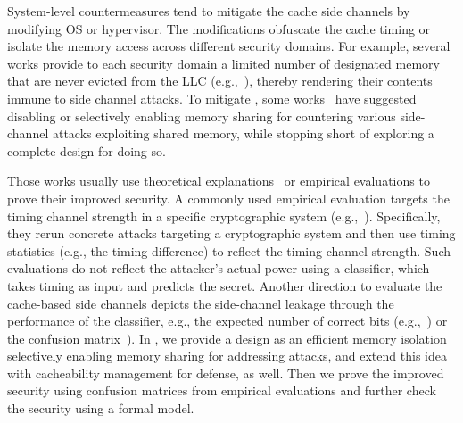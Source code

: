 System-level countermeasures tend to mitigate the cache side channels
by modifying \gls{OS} or hypervisor. The modifications obfuscate the
cache timing or isolate the memory access across different security
domains. For example, several works provide to each security domain a
limited number of designated memory that are never evicted from the
LLC (e.g.,~\cite{kim2012stealthmem,CATalyst}), thereby rendering their
contents immune to \primeprobe side channel attacks. To mitigate
\flushreload, some works~\cite{owens2011non,zhang2014cross,dedup:sp16}
have suggested disabling or selectively enabling memory sharing for
countering various side-channel attacks exploiting shared memory,
while stopping short of exploring a complete design for doing so.  

Those works usually use theoretical
explanations~\cite{kim2012stealthmem,wang2008novel} or empirical
evaluations to prove their improved security. A commonly used
empirical evaluation targets the timing channel strength in a
specific cryptographic system (e.g.,~\cite{coppens2009practical,konighofer2008fast,keramidas2008non,Liu:2014:RFC,CATalyst}).
Specifically, they rerun concrete attacks targeting a cryptographic
system and then use timing statistics (e.g., the timing difference)
to reflect the timing channel strength. Such evaluations do not
reflect the attacker's actual power using a classifier, which takes
timing as input and predicts the secret. Another direction to
evaluate the cache-based side channels depicts the side-channel
leakage through the performance of the classifier, e.g., the expected
number of correct bits (e.g.,~\cite{crane2015thwarting}) or the
confusion matrix~\cite{rane2015raccoon}).  In
, we provide a \coa design as an efficient
memory isolation selectively enabling memory sharing for addressing
\flushreload attacks, and extend this idea with cacheability
management for \primeprobe defense, as well. Then we prove the
improved security using confusion matrices from empirical evaluations
and further check the security using a formal model.


